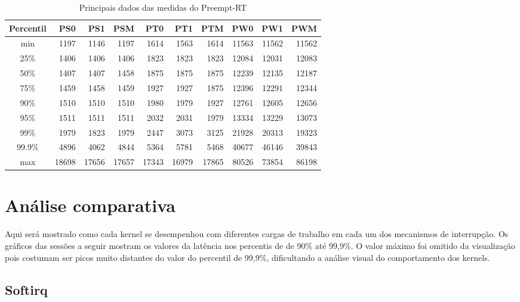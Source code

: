 \begin{table}[!htb]
\centering
\begin{center}
\begin{tabular}{|c|r|r|r|r|r|r|r|r|r|}
\toprule
Percentil &    PS0 &    PS1 &    PSM &    PT0 &    PT1 &    PTM &    PW0 &     PW1 &    PWM \\
\midrule
  min &   1197 &   1146 &   1197 &   1614 &   1563 &   1614 &  11563 &  11562 &  11562 \\
  25\% &   1406 &   1406 &   1406 &   1823 &   1823 &   1823 &  12084 &  12031 &  12083 \\
  50\% &   1407 &   1407 &   1458 &   1875 &   1875 &   1875 &  12239 &  12135 &  12187 \\
  75\% &   1459 &   1458 &   1459 &   1927 &   1927 &   1875 &  12396 &  12291 &  12344 \\
  90\% &   1510 &   1510 &   1510 &   1980 &   1979 &   1927 &  12761 &  12605 &  12656 \\
  95\% &   1511 &   1511 &   1511 &   2032 &   2031 &   1979 &  13334 &  13229 &  13073 \\
  99\% &   1979 &   1823 &   1979 &   2447 &   3073 &   3125 &  21928 &  20313 &  19323 \\
99.9\% &   4896 &   4062 &   4844 &   5364 &   5781 &   5468 &  40677 &  46146 &  39843 \\
max &  18698 &  17656 &  17657 &  17343 &  16979 &  17865 &  80526 &  73854 &  86198 \\
\bottomrule
\end{tabular}
\end{center}
\caption{Principais dados das medidas do Preempt-RT}
\label{table:prt}
\end{table}

\section{Análise comparativa}

Aqui será mostrado como cada kernel se desempenhou com diferentes cargas de trabalho em cada um dos mecanismos de interrupção. Os gráficos das sessões a seguir mostram os valores da latência nos percentis de de 90\% até 99,9\%. O valor máximo foi omitido da visualização pois costumam ser picos muito distantes do valor do percentil de 99,9\%, dificultando a análise visual do comportamento dos kernels.


\subsection{Softirq}

